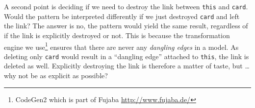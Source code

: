 A second point is deciding if we need to destroy the link between \texttt{this} and \texttt{card}. Would the pattern be interpreted differently if we just destroyed
\texttt{card} and left the link?  The answer is no, the pattern would yield the same result, regardless of if the link is explicitly destroyed or not.
This is because the transformation engine we use\footnote{CodeGen2 which is part of Fujaba \url{http://www.fujaba.de/}} ensures that there are never any
 \emph{dangling edges} in a model.  As deleting only \texttt{card} would result in a ``dangling edge'' attached to \texttt{this}, the link
is deleted as well. Explicitly destroying the link is therefore a matter of taste, but \ldots why not be as explicit as possible?
